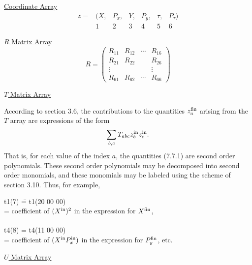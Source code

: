 \begin{center}
\underline{Coordinate Array}
\[\begin{array}{ccccccc}
       z = & (X, & P_x, & Y, & P_y, & \tau, & P_\tau)\\
           &  1  &  2   & 3  &  4   &   5   &   6
\end{array}\]

\vspace{5mm}

\underline{$R$ Matrix Array}
\[  R= \left( \begin{array}{cccc}
R_{11} & R_{12} & \cdots & R_{16} \\
R_{21} & R_{22} &        & R_{26} \\
\vdots &        &        & \vdots \\
R_{61} & R_{62} & \cdots & R_{66}
\end{array}
\right) \]

\vspace{5mm}

\underline{$T$ Matrix Array}
\end{center}

     According to section 3.6, the contributions to the quantities $z_a^{\mbox{\scriptsize fin}}$
arising from the $T$ array are expressions of the form
\begin{equation}
\sum_{b,c} T_{abc} z_b^{\mbox{\scriptsize in}} z_c^{\mbox{\scriptsize in}}.
\end{equation}
That is, for each value of the index $a$, the quantities (7.7.1) are second
order polynomials.  These second order polynomials may be decomposed into
second order monomials, and these monomials may be labeled using the scheme
of section 3.10.  Thus, for example,

\begin{tabbing}
  t1(7) \= = t1(20 00 00)\\
        \> = coefficient of $(X^{\mbox{\scriptsize in}})^2$  in the expression for
$X^{\mbox{\scriptsize fin}}$,\\
\vspace{5mm}\\
  t4(8) \> = t4(11 00 00)\\
        \> = coefficient of $(X^{\mbox{\scriptsize in}}  P_x^{\mbox{\scriptsize in}})$ in the expression for $P_y^{\mbox{\scriptsize fin}}$, etc.
\end{tabbing}
\pagebreak
\begin{center}
\underline{$U$ Matrix Array}
\end{center}

